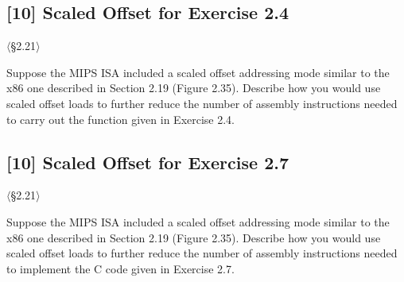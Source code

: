 \problembreak

\subsection{[10] Scaled Offset for Exercise 2.4}
\hypertarget{prob-2.41}{}
\noindent$\langle$\S2.21$\rangle$\medskip

\noindent Suppose the MIPS ISA included a scaled offset addressing mode
similar to the x86 one described in Section 2.19 (Figure 2.35). Describe how
you would use scaled offset loads to further reduce the number of assembly
instructions needed to carry out the function given in Exercise 2.4.

\problembreak

\subsection{[10] Scaled Offset for Exercise 2.7}
\hypertarget{prob-2.42}{}
\noindent$\langle$\S2.21$\rangle$\medskip

\noindent Suppose the MIPS ISA included a scaled offset addressing mode
similar to the x86 one described in Section 2.19 (Figure 2.35). Describe how
you would use scaled offset loads to further reduce the number of assembly
instructions needed to implement the C code given in Exercise 2.7.
